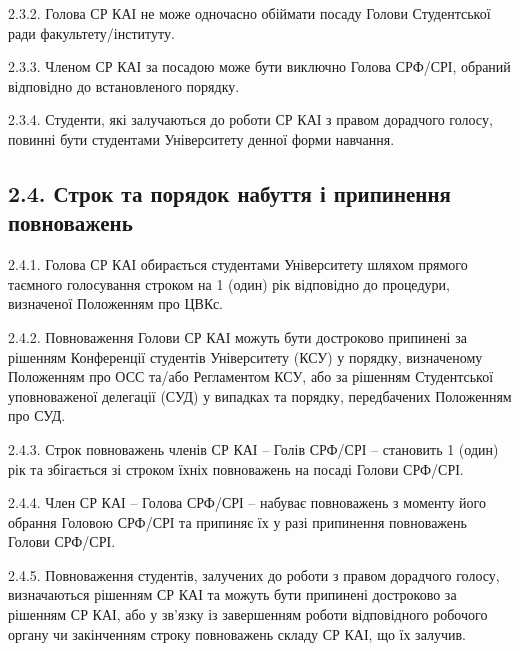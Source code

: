     2.3.2. Голова СР КАІ не може одночасно обіймати посаду Голови Студентської ради факультету/інституту.

    2.3.3. Членом СР КАІ за посадою може бути виключно Голова СРФ/СРІ, обраний відповідно до встановленого порядку.

    2.3.4. Студенти, які залучаються до роботи СР КАІ з правом дорадчого голосу, повинні бути студентами Університету денної форми навчання.

\subsection*{2.4. Строк та порядок набуття і припинення повноважень}
    2.4.1. Голова СР КАІ обирається студентами Університету шляхом прямого таємного голосування строком на 1 (один) рік відповідно до процедури, визначеної Положенням про ЦВКс.

    2.4.2. Повноваження Голови СР КАІ можуть бути достроково припинені за рішенням Конференції студентів Університету (КСУ) у порядку, визначеному Положенням про ОСС та/або Регламентом КСУ, або за рішенням Студентської уповноваженої делегації (СУД) у випадках та порядку, передбачених Положенням про СУД.

    2.4.3. Строк повноважень членів СР КАІ – Голів СРФ/СРІ – становить 1 (один) рік та збігається зі строком їхніх повноважень на посаді Голови СРФ/СРІ.

    2.4.4. Член СР КАІ – Голова СРФ/СРІ – набуває повноважень з моменту його обрання Головою СРФ/СРІ та припиняє їх у разі припинення повноважень Голови СРФ/СРІ.

    2.4.5. Повноваження студентів, залучених до роботи з правом дорадчого голосу, визначаються рішенням СР КАІ та можуть бути припинені достроково за рішенням СР КАІ, або у зв'язку із завершенням роботи відповідного робочого органу чи закінченням строку повноважень складу СР КАІ, що їх залучив. 